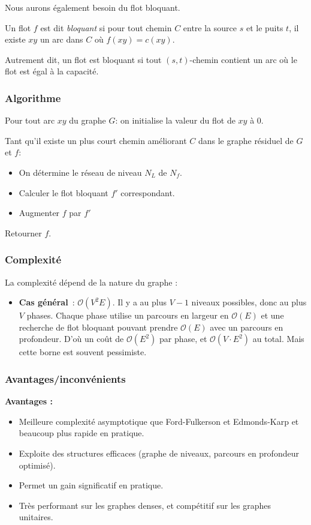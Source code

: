 \documentclass[a4paper]{article}
\begin{document}
Nous aurons également besoin du flot bloquant.
\begin{definition}
	Un flot $f$ est dit \emph{bloquant} si pour tout chemin $C$ entre la source $s$ et le puits $t$, il existe $xy$ un arc dans $C$ où $f(xy)=c(xy)$.

	Autrement dit, un flot est bloquant si tout $(s,t)$-chemin contient un arc où le flot est égal à la capacité.
\end{definition}

\subsubsection{Algorithme}
Pour tout arc $xy$ du graphe $G$: on initialise la valeur du flot de $xy$ à $0$.

Tant qu'il existe un plus court chemin améliorant $C$ dans le graphe résiduel de $G$ et $f$:
\begin{itemize}
    \item 
	On détermine le réseau de niveau $N_L$ de $N_f$.
    \item
    Calculer le flot bloquant $f'$ correspondant.
    \item 
    Augmenter $f$ par $f'$
\end{itemize}
Retourner $f$.
\subsubsection{Complexité}

La complexité dépend de la nature du graphe :
\begin{itemize}
    \item \textbf{Cas général} : $\mathcal{O}(V^2 E)$. Il y a au plus $V - 1$ niveaux possibles, donc au plus $V$ phases. Chaque phase utilise un parcours en largeur en $\mathcal{O}(E)$ et une recherche de flot bloquant pouvant prendre $\mathcal{O}(E)$ avec un parcours en profondeur. D’où un coût de $\mathcal{O}(E^2)$ par phase, et $\mathcal{O}(V \cdot E^2)$ au total. Mais cette borne est souvent pessimiste.
\end{itemize}

\subsubsection{Avantages/inconvénients}
\textbf{Avantages :}
\begin{itemize}
    \item Meilleure complexité asymptotique que Ford-Fulkerson et Edmonds-Karp et beaucoup plus rapide en pratique.
    \item Exploite des structures efficaces (graphe de niveaux, parcours en profondeur optimisé).
    \item Permet un gain significatif en pratique.
    \item Très performant sur les graphes denses, et compétitif sur les graphes unitaires.
\end{itemize}
\end{document}
